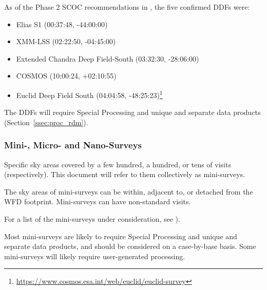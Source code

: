 As of the Phase 2 SCOC recommendations in , the five 
confirmed DDFs were:

\begin{itemize}
\item Elias S1 (00:37:48, -44:00:00)
\item XMM-LSS (02:22:50, -04:45:00)
\item Extended Chandra Deep Field-South (03:32:30, -28:06:00)
\item COSMOS (10:00:24, +02:10:55)
\item Euclid Deep Field South  (04:04:58, -48:25:23)\footnote{\url{https://www.cosmos.esa.int/web/euclid/euclid-survey}}
\end{itemize}

The DDFs will require Special Processing and unique and separate data products (Section~\ref{ssec:proc_rdm}).

\subsubsection{Mini-, Micro- and Nano-Surveys}

Specific sky areas covered by a few hundred, a hundred, or tens of visits (respectively).
This document will refer to them collectively as mini-surveys.

The sky areas of mini-surveys can be within, adjacent to, or detached from the WFD footprint.
Mini-surveys can have non-standard visits.

For a list of the mini-surveys under consideration,
see ).

Most mini-surveys are likely to require Special Processing and unique and separate data products,
and should be considered on a case-by-base basis.
Some mini-surveys will likely require user-generated processing.
